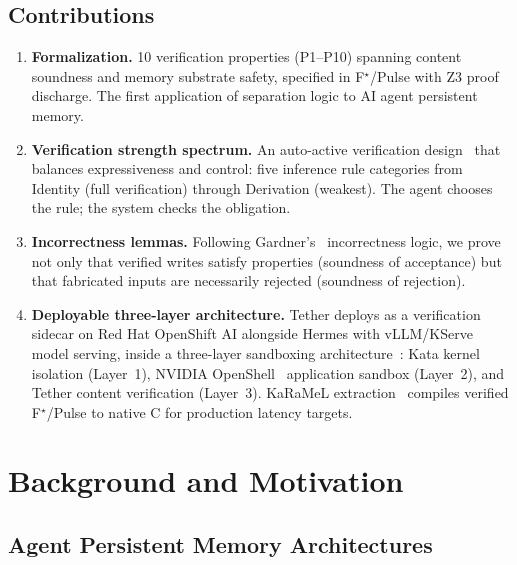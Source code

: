 \documentclass[sigplan,screen,nonacm]{acmart}
\newcommand{\fstar}{F\ensuremath{^\star}}
\begin{document}
\subsection{Contributions}

\begin{enumerate}
  \item \textbf{Formalization.} 10 verification properties (P1--P10)
    spanning content soundness and memory substrate safety, specified in
    \fstar{}/Pulse with Z3 proof discharge. The first application of
    separation logic to AI agent persistent memory.

  \item \textbf{Verification strength spectrum.} An auto-active verification
    design~\cite{leino2010dafny} that balances expressiveness and control:
    five inference rule categories from Identity (full verification) through
    Derivation (weakest). The agent chooses the rule; the system checks the
    obligation.

  \item \textbf{Incorrectness lemmas.} Following
    Gardner's~\cite{gardner2026incorrectness} incorrectness logic, we prove
    not only that verified writes satisfy properties (soundness of
    acceptance) but that fabricated inputs are necessarily rejected
    (soundness of rejection).

  \item \textbf{Deployable three-layer architecture.} Tether deploys as a
    verification sidecar on Red Hat OpenShift AI alongside Hermes with
    vLLM/KServe model serving, inside a three-layer sandboxing
    architecture~\cite{osc2026layered}: Kata kernel isolation (Layer~1),
    NVIDIA OpenShell~\cite{nvidia2026openshell} application sandbox
    (Layer~2), and Tether content verification (Layer~3). KaRaMeL
    extraction~\cite{protzenko2017verified} compiles verified
    \fstar{}/Pulse to native C for production latency targets.
\end{enumerate}


\section{Background and Motivation}
\label{sec:background}

\subsection{Agent Persistent Memory Architectures}
\end{document}
